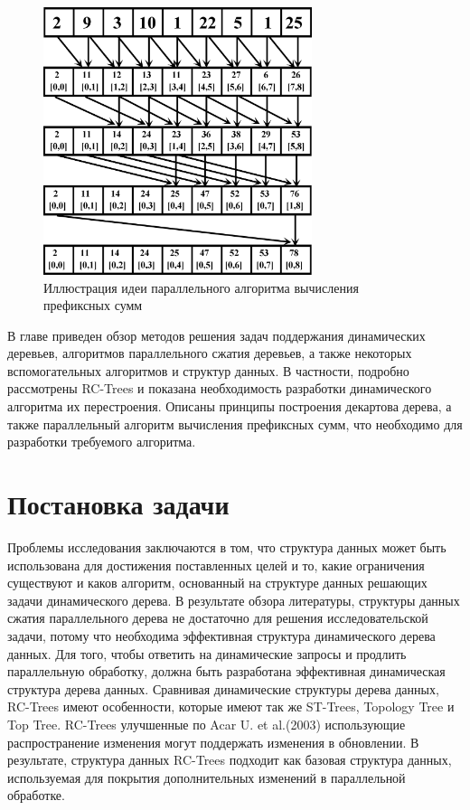 \documentclass[specification,annotation]{itmo-student-thesis}
\begin{document}
\begin{figure}[!ht]
\centering
\includegraphics[width=0.7\textwidth]{pic/parallel-prefix-sum.png}
\caption{Иллюстрация идеи параллельного алгоритма вычисления префиксных сумм}\label{fig:prefix-sum}
\end{figure}

\chapterconclusion

В главе приведен обзор методов решения задач поддержания динамических деревьев, алгоритмов параллельного сжатия деревьев, а также некоторых вспомогательных алгоритмов и структур данных. 
В частности, подробно рассмотрены RC-Trees и показана необходимость разработки динамического алгоритма их перестроения. Описаны принципы построения декартова дерева, а также параллельный алгоритм вычисления префиксных сумм, что необходимо для разработки требуемого алгоритма. 

\chapter{Постановка задачи}

Проблемы исследования заключаются в том, что структура данных может быть использована для достижения поставленных целей и то, какие ограничения существуют и каков алгоритм, основанный на структуре данных решающих задачи динамического дерева. В результате обзора литературы, структуры данных сжатия параллельного дерева не достаточно для решения исследовательской задачи, потому что необходима эффективная структура 
динамического дерева данных. Для того, чтобы ответить на динамические запросы и продлить параллельную обработку, должна быть разработана эффективная динамическая структура дерева данных. Сравнивая динамические структуры дерева данных, RC-Trees имеют особенности, которые имеют так же ST-Trees, Topology Tree и Top Tree. RC-Trees улучшенные по Acar U. et al.(2003) использующие распространение изменения могут поддержать изменения в обновлении. В результате, структура данных RC-Trees подходит как базовая структура данных, используемая для покрытия дополнительных изменений в параллельной 
обработке.
\end{document}
